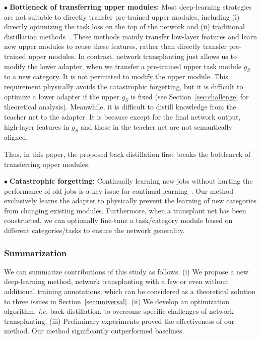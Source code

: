 \documentclass[10pt,twocolumn,letterpaper]{article}
\begin{document}
\noindent
$\bullet\;$\textbf{Bottleneck of transferring upper modules\textcolor{red}{\footnotemark[1]}:} Most deep-learning strategies are not suitable to directly transfer pre-trained upper modules, including (i) directly optimizing the task loss on the top of the network and (ii) traditional distillation methods~\cite{distill}. These methods mainly transfer low-layer features and learn new upper modules to reuse these features, rather than directly transfer pre-trained upper modules. In contrast, network transplanting just allows us to modify the lower adapter, when we transfer a pre-trained upper task module $g_{S}$ to a new category. It is not permitted to modify the upper module. This requirement physically avoids the catastrophic forgetting, but it is difficult to optimize a lower adapter if the upper $g_{S}$ is fixed (see Section~\ref{sec:challenge} for theoretical analysis). Meanwhile, it is difficult to distill knowledge from the teacher net to the adapter. It is because except for the final network output, high-layer features in $g_{S}$ and those in the teacher net are not semantically aligned.

Thus, in this paper, the proposed back distillation first breaks the bottleneck of transferring upper modules.

\noindent
$\bullet\;$\textbf{Catastrophic forgetting:} Continually learning new jobs without hurting the performance of old jobs is a key issue for continual learning~\cite{ProgressiveNN,continualLearning}. Our method exclusively learns the adapter to physically prevent the learning of new categories from changing existing modules. Furthermore, when a transplant net has been constructed, we can optionally fine-tune a task/category module based on different categories/tasks to ensure the network generality.


\subsubsection{Summarization}

We can summarize contributions of this study as follows. (i) We propose a new deep-learning method, network transplanting with a few or even without additional training annotations, which can be considered as a theoretical solution to three issues in Section~\ref{sec:universal}. (ii) We develop an optimization algorithm, \emph{i.e.} back-distillation, to overcome specific challenges of network transplanting. (iii) Preliminary experiments proved the effectiveness of our method. Our method significantly outperformed baselines.
\end{document}
